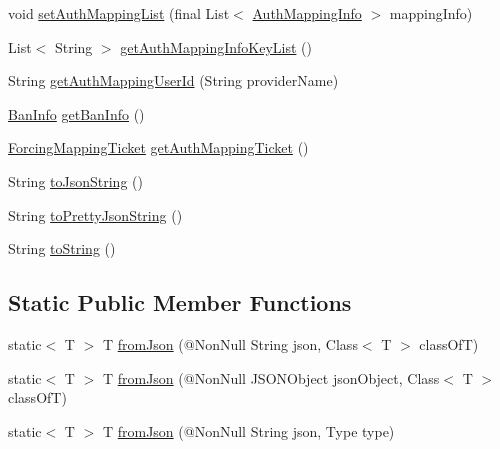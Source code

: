 \begin{DoxyCompactItemize}
\item 
void \hyperlink{classcom_1_1toast_1_1android_1_1gamebase_1_1auth_1_1data_1_1_auth_token_ae4eb9c89ac0d29ae46eef90ee1d552b0}{set\+Auth\+Mapping\+List} (final List$<$ \hyperlink{classcom_1_1toast_1_1android_1_1gamebase_1_1auth_1_1data_1_1_auth_mapping_info}{Auth\+Mapping\+Info} $>$ mapping\+Info)
\item 
List$<$ String $>$ \hyperlink{classcom_1_1toast_1_1android_1_1gamebase_1_1auth_1_1data_1_1_auth_token_abf4f630629a54493de338073ce33e60a}{get\+Auth\+Mapping\+Info\+Key\+List} ()
\item 
String \hyperlink{classcom_1_1toast_1_1android_1_1gamebase_1_1auth_1_1data_1_1_auth_token_a0a12ee1665355cc28dca331e56250774}{get\+Auth\+Mapping\+User\+Id} (String provider\+Name)
\item 
\hyperlink{classcom_1_1toast_1_1android_1_1gamebase_1_1auth_1_1data_1_1_ban_info}{Ban\+Info} \hyperlink{classcom_1_1toast_1_1android_1_1gamebase_1_1auth_1_1data_1_1_auth_token_a2af170ff05b78dcaf81df7fb2c9c2764}{get\+Ban\+Info} ()
\item 
\hyperlink{classcom_1_1toast_1_1android_1_1gamebase_1_1auth_1_1mapping_1_1data_1_1_forcing_mapping_ticket}{Forcing\+Mapping\+Ticket} \hyperlink{classcom_1_1toast_1_1android_1_1gamebase_1_1auth_1_1data_1_1_auth_token_a7ef00c0082631071dd05cef95e360473}{get\+Auth\+Mapping\+Ticket} ()
\item 
String \hyperlink{classcom_1_1toast_1_1android_1_1gamebase_1_1base_1_1_value_object_a58acf6402880e9769d79d8667581fa6a}{to\+Json\+String} ()
\item 
String \hyperlink{classcom_1_1toast_1_1android_1_1gamebase_1_1base_1_1_value_object_a054431f3d988a22295cfc8b784ff2637}{to\+Pretty\+Json\+String} ()
\item 
String \hyperlink{classcom_1_1toast_1_1android_1_1gamebase_1_1base_1_1_value_object_ad146fa8579a5f8a876c4688cc5a68520}{to\+String} ()
\end{DoxyCompactItemize}
\subsection*{Static Public Member Functions}
\begin{DoxyCompactItemize}
\item 
static$<$ T $>$ T \hyperlink{classcom_1_1toast_1_1android_1_1gamebase_1_1base_1_1_value_object_ae6655c88c20a9a8406dc11b46250ac7b}{from\+Json} (@Non\+Null String json, Class$<$ T $>$ class\+OfT)
\item 
static$<$ T $>$ T \hyperlink{classcom_1_1toast_1_1android_1_1gamebase_1_1base_1_1_value_object_ab83c4196ee2e3f11553bbe0f04dc2101}{from\+Json} (@Non\+Null J\+S\+O\+N\+Object json\+Object, Class$<$ T $>$ class\+OfT)
\item 
static$<$ T $>$ T \hyperlink{classcom_1_1toast_1_1android_1_1gamebase_1_1base_1_1_value_object_aa901d97d495150b54bcb80c05672f58a}{from\+Json} (@Non\+Null String json, Type type)
\end{DoxyCompactItemize}


